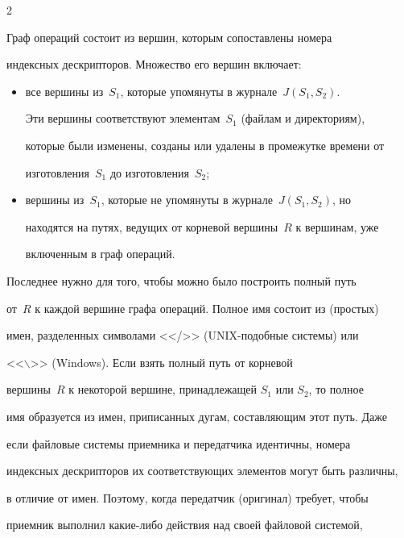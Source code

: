 \begin{multicols}{2}
\vspace*{-1pt}





      Граф операций состоит из вершин, которым сопоставлены номера 


индексных дескрипторов. Множество его вершин включает:


      \begin{itemize}


\item все вершины из~$S_1$, которые упомянуты в журнале~$J(S_1, S_2)$. 


Эти вершины соответствуют элементам~$S_1$ (файлам и директориям), 


которые были изменены, созданы или удалены в промежутке времени от 


изготовления~$S_1$ до изготовления~$S_2$;\\[-15pt]


\item вершины из~$S_1$, которые не упомянуты в журнале~$J(S_1, S_2)$, но 


находятся на путях, ведущих от корневой вершины~$R$ к вершинам, уже 


включенным в граф операций. 


\end{itemize}





      Последнее нужно для того, чтобы можно было построить полный путь 


от~$R$ к каждой вершине графа операций. Полное имя  состоит из (прос\-тых) 


имен, разделенных символами <</>> (UNIX-по\-доб\-ные системы)  или 


<<$\backslash$>> (Windows).  Если взять полный путь от корневой 


вершины~$R$ к некоторой вершине, принадлежащей $S_1$ или $S_2$, то полное 


имя образуется из имен, приписанных дугам, составляющим этот путь.  Даже 


если файловые системы приемника и передатчика идентичны, номера 


индексных де\-скрип\-то\-ров их соответствующих элементов могут быть различны, 


в отличие от имен. Поэтому, когда передатчик (оригинал) требует, чтобы 


приемник выполнил какие-либо действия над своей файловой системой, 



\end{multicols}
